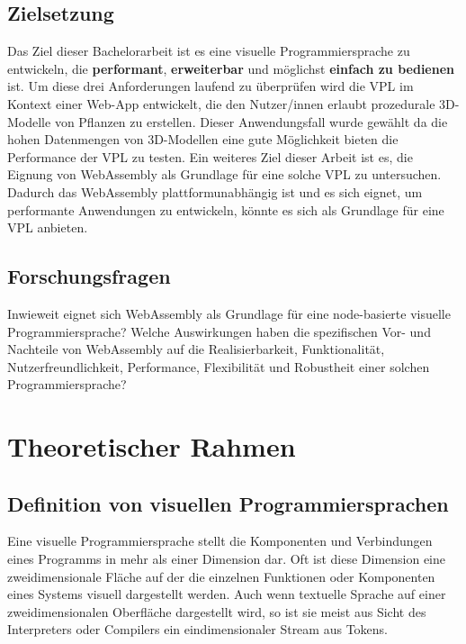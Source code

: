 \documentclass[ngerman]{article}
\begin{document}
\subsection{Zielsetzung} 
\label{sec:Zielsetzung}

Das Ziel dieser Bachelorarbeit ist es eine visuelle Programmiersprache zu entwickeln, die \textbf{performant}, \textbf{erweiterbar} und möglichst \textbf{einfach zu bedienen} ist.
Um diese drei Anforderungen laufend zu überprüfen wird die VPL im Kontext einer Web-App entwickelt, die den Nutzer/innen erlaubt prozedurale 3D-Modelle von Pflanzen zu erstellen.
Dieser Anwendungsfall wurde gewählt da die hohen Datenmengen von 3D-Modellen eine gute Möglichkeit bieten die Performance der VPL zu testen.
\br
Ein weiteres Ziel dieser Arbeit ist es, die Eignung von WebAssembly als Grundlage für eine solche VPL zu untersuchen. 
Dadurch das WebAssembly plattformunabhängig ist und es sich eignet, um performante Anwendungen zu entwickeln, könnte es sich als Grundlage für eine VPL anbieten.

\subsection{Forschungsfragen}

Inwieweit eignet sich WebAssembly als Grundlage für eine node-basierte visuelle Programmiersprache?  
\br
Welche Auswirkungen haben die spezifischen Vor- und Nachteile von WebAssembly auf die Realisierbarkeit, Funktionalität, Nutzerfreundlichkeit, Performance, Flexibilität und Robustheit einer solchen Programmiersprache?

\pagebreak

\section{Theoretischer Rahmen}

\subsection{Definition von visuellen Programmiersprachen}
Eine visuelle Programmiersprache stellt die Komponenten und Verbindungen eines Programms in mehr als einer Dimension dar. Oft ist diese Dimension eine zweidimensionale Fläche auf der die einzelnen Funktionen oder Komponenten eines Systems visuell dargestellt werden. \cite{Myers}
Auch wenn textuelle Sprache auf einer zweidimensionalen Oberfläche dargestellt wird, so ist sie meist aus Sicht des Interpreters oder Compilers ein eindimensionaler Stream aus Tokens.
\end{document}

